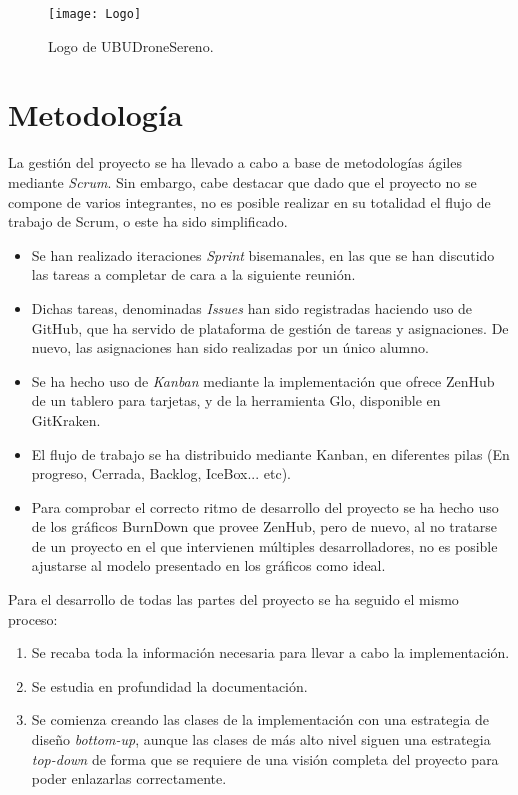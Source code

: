 \begin{figure}[H]
	\centering
	\texttt{[image: Logo]}
	\caption[Logo]{Logo de UBUDroneSereno.}\label{fig:Logo}
\end{figure}



\section{Metodología}

La gestión del proyecto se ha llevado a cabo a base de metodologías ágiles mediante \emph{Scrum}.
Sin embargo, cabe destacar que dado que el proyecto no se compone de varios integrantes, no es posible realizar en su totalidad el flujo de trabajo de Scrum, o este ha sido simplificado. 

\begin{itemize} 
\item Se han realizado iteraciones \emph{Sprint} bisemanales, en las que se han discutido las tareas a completar de cara a la siguiente reunión. 
\item Dichas tareas, denominadas \emph{Issues} han sido registradas haciendo uso de GitHub, que ha servido de plataforma de gestión de tareas y asignaciones. De nuevo, las asignaciones han sido realizadas por un único alumno. 
\item Se ha hecho uso de \emph{Kanban} mediante la implementación que ofrece ZenHub de un tablero para tarjetas, y de la herramienta Glo, disponible en GitKraken. 
\item El flujo de trabajo se ha distribuido mediante Kanban, en diferentes pilas (En progreso, Cerrada, Backlog, IceBox... etc).
\item Para comprobar el correcto ritmo de desarrollo del proyecto se ha hecho uso de los gráficos BurnDown que provee ZenHub, pero de nuevo, al no tratarse de un proyecto en el que intervienen múltiples desarrolladores, no es posible ajustarse al modelo presentado en los gráficos como ideal. 
\end{itemize}

Para el desarrollo de todas las partes del proyecto se ha seguido el mismo proceso: 
\begin{enumerate}
\item Se recaba toda la información necesaria para llevar a cabo la implementación.
\item Se estudia en profundidad la documentación.
\item Se comienza creando las clases de la implementación con una estrategia de diseño \emph{bottom-up}, aunque las clases de más alto nivel siguen una estrategia \emph{top-down} de forma que se requiere de una visión completa del proyecto para poder enlazarlas correctamente.
\end{enumerate}

